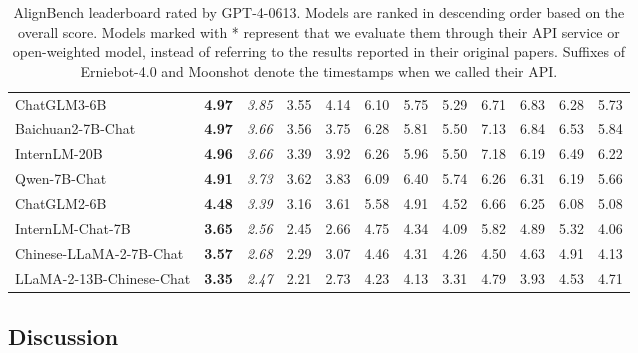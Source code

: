 \documentclass[11pt, a4paper, logo, copyright, nonumbering]{deepseek}
\begin{document}
\begin{CJK*}{UTF8}{gbsn}
\begin{table}[!t]
{\begin{tabular}{@{}l|c|c|cc|c|cccccc@{}}
    ChatGLM3-6B & \textbf{4.97} & \multicolumn{1}{c|}{\textit{3.85}} & 3.55 & 4.14 & \multicolumn{1}{c|}{6.10} & 5.75 & 5.29 & 6.71 & 6.83 & 6.28 & 5.73 \\
    Baichuan2-7B-Chat & \textbf{4.97} & \multicolumn{1}{c|}{\textit{3.66}} & 3.56 & 3.75 & \multicolumn{1}{c|}{6.28} & 5.81 & 5.50 & 7.13 & 6.84 & 6.53 & 5.84 \\
    InternLM-20B & \textbf{4.96} & \multicolumn{1}{c|}{\textit{3.66}} & 3.39 & 3.92 & \multicolumn{1}{c|}{6.26} & 5.96 & 5.50 & 7.18 & 6.19 & 6.49 & 6.22 \\
    Qwen-7B-Chat & \textbf{4.91} & \multicolumn{1}{c|}{\textit{3.73}} & 3.62 & 3.83 & \multicolumn{1}{c|}{6.09} & 6.40 & 5.74 & 6.26 & 6.31 & 6.19 & 5.66 \\
    ChatGLM2-6B & \textbf{4.48} & \multicolumn{1}{c|}{\textit{3.39}} & 3.16 & 3.61 & \multicolumn{1}{c|}{5.58} & 4.91 & 4.52 & 6.66 & 6.25 & 6.08 & 5.08 \\
    InternLM-Chat-7B & \textbf{3.65} & \multicolumn{1}{c|}{\textit{2.56}} & 2.45 & 2.66 & \multicolumn{1}{c|}{4.75} & 4.34 & 4.09 & 5.82 & 4.89 & 5.32 & 4.06 \\
    Chinese-LLaMA-2-7B-Chat & \textbf{3.57} & \multicolumn{1}{c|}{\textit{2.68}} & 2.29 & 3.07 & \multicolumn{1}{c|}{4.46} & 4.31 & 4.26 & 4.50 & 4.63 & 4.91 & 4.13 \\
    LLaMA-2-13B-Chinese-Chat & \textbf{3.35} & \multicolumn{1}{c|}{\textit{2.47}} & 2.21 & 2.73 & \multicolumn{1}{c|}{4.23} & 4.13 & 3.31 & 4.79 & 3.93 & 4.53 & 4.71 \\ \bottomrule
    \end{tabular}
    }
    \caption{
    AlignBench leaderboard rated by GPT-4-0613. 
    Models are ranked in descending order based on the overall score. 
    Models marked with * represent that we evaluate them through their API service or open-weighted model, instead of referring to the results reported in their original papers. 
    Suffixes of Erniebot-4.0 and Moonshot denote the timestamps when we called their API. 
    }
    \label{tab:align_bench_results}
\end{table}

\subsection{Discussion}


\end{CJK*}
\end{document}
